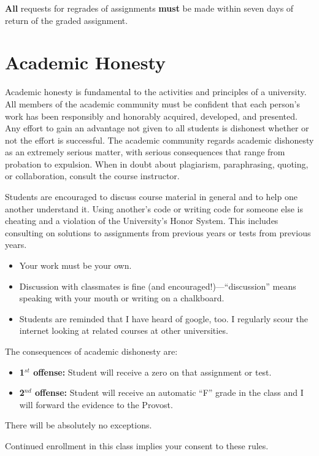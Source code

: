 \documentclass[11pt]{article}
\begin{document}
{\bf All} requests for regrades of assignments {\bf must} be made within seven days of return of the graded assignment.

\section{Academic Honesty	}

Academic honesty is fundamental to the activities and principles of a university. All members of the academic community must be confident that each person's work has been responsibly and honorably acquired, developed, and presented. Any effort to gain an advantage not given to all students is dishonest whether or not the effort is successful. The academic community regards academic dishonesty as an extremely serious matter, with serious consequences that range from probation to expulsion. When in doubt about plagiarism, paraphrasing, quoting, or collaboration, consult the course instructor. 
	
	Students are encouraged to discuss course material in general and to help one another understand it. Using another's code or writing code for someone else is cheating and a violation of the University's Honor System. This includes consulting on solutions to assignments from previous years or tests from previous years. 
\begin{itemize}
\item Your work must be your own. 
\item Discussion with classmates is fine (and encouraged!)---``discussion'' means speaking with your mouth or writing on a chalkboard.
\item Students are reminded that I have heard of google, too. I regularly scour the internet looking at related courses at other universities.
\end{itemize}

The consequences of academic dishonesty are:
\begin{itemize}
\item[] {\bf 1$^{st}$ offense:} Student will receive a zero on that assignment or test.
\item[] {\bf 2$^{nd}$ offense:} Student will receive an automatic “F” grade in the class and I will forward the evidence to the Provost.
\end{itemize}
There will be absolutely no exceptions.

Continued enrollment in this class implies your consent to these rules.
\end{document}
